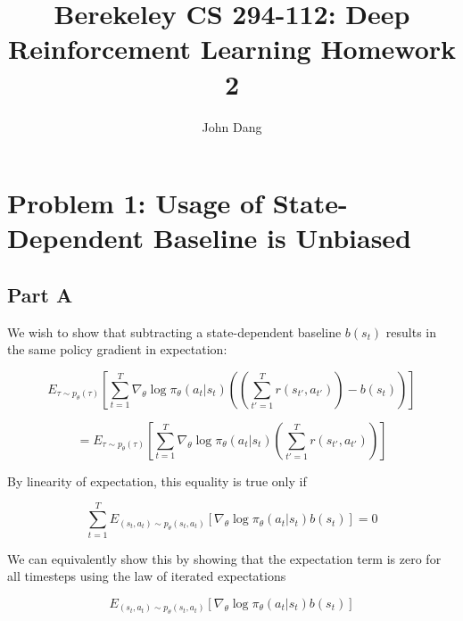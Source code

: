 \documentclass{article}
\title{Berekeley CS 294-112: Deep Reinforcement Learning Homework 2}
\author{John Dang}
\date{}
\begin{document}
    \maketitle

    \section{Problem 1: Usage of State-Dependent Baseline is Unbiased}

    \subsection{Part A}
    We wish to show that subtracting a state-dependent baseline $b(s_t)$ 
    results in the same policy gradient in expectation:

    \begin{equation*}
        E_{\tau\sim p_\theta(\tau)} \left[ \sum_{t=1}^T{\nabla_\theta \log \pi_\theta(a_t|s_t)} \left( \left( \sum_{t'=1}^T{r(s_{t'},a_{t'})} \right) - b(s_t)\right)\right]
    \end{equation*}

    \begin{equation*}
        = E_{\tau\sim p_\theta(\tau)} \left[ \sum_{t=1}^T{\nabla_\theta \log \pi_\theta(a_t|s_t)} \left( \sum_{t'=1}^T{r(s_{t'},a_{t'})}\right)\right]
    \end{equation*}

   By linearity of expectation, this equality is true only if 

    \begin{equation*}
       \sum_{t=1}^{T}{ E_{(s_t,a_t)\sim p_\theta(s_t,a_t)} \left[ \nabla_\theta \log \pi_\theta(a_t|s_t) b(s_t)\right]} = 0
    \end{equation*}



    We can equivalently show this by showing that the  expectation term is zero for all timesteps using the law of iterated expectations

    \begin{equation*}
        E_{(s_t,a_t)\sim p_\theta(s_t,a_t)} \left[ \nabla_\theta \log \pi_\theta(a_t|s_t) b(s_t)\right]
    \end{equation*}
\end{document}
